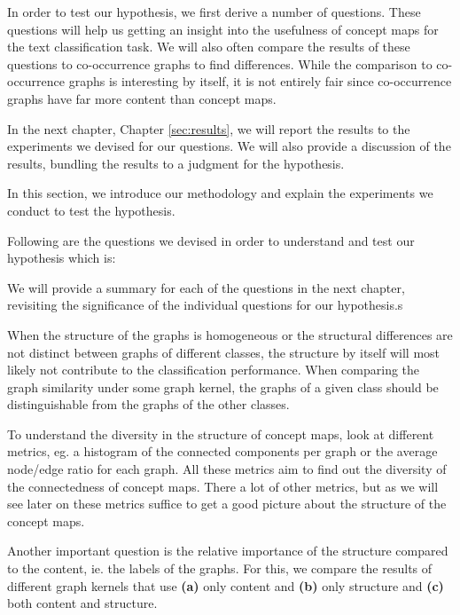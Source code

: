 In order to test our hypothesis, we first derive a number of questions.
These questions will help us getting an insight into the usefulness of concept maps for the text classification task.
We will also often compare the results of these questions to co-occurrence graphs to find differences. While the comparison to co-occurrence graphs is interesting by itself, it is not entirely fair since co-occurrence graphs have far more content than concept maps.

In the next chapter, Chapter \ref{sec:results}, we will report the results to the experiments we devised for our questions.
We will also provide a discussion of the results, bundling the results to a judgment for the hypothesis.

In this section, we introduce our methodology and explain the experiments we conduct to test the hypothesis.

Following are the questions we devised in order to understand and test our hypothesis which is:
\begin{quote}\hypothesis\end{quote}

We will provide a summary for each of the questions in the next chapter, revisiting the significance of the individual questions for our hypothesis.s


When the structure of the graphs is homogeneous or the structural differences are not distinct between graphs of different classes, the structure by itself will most likely not contribute to the classification performance.
When comparing the graph similarity under some graph kernel, the graphs of a given class should be distinguishable from the graphs of the other classes.

To understand the diversity in the structure of concept maps, look at different metrics, eg. a histogram of the connected components per graph or the average node/edge ratio for each graph.
All these metrics aim to find out the diversity of the connectedness of concept maps. There a lot of other metrics, but as we will see later on these metrics suffice to get a good picture about the structure of the concept maps.

Another important question is the relative importance of the structure compared to the content, ie. the labels of the graphs.
For this, we compare the results of different graph kernels that use \textbf{(a)} only content and \textbf{(b)} only structure and \textbf{(c)} both content and structure.

